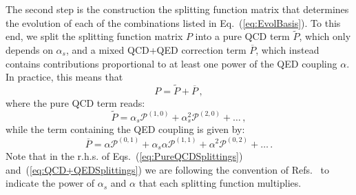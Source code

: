 The second step is the construction the splitting function matrix that
determines the evolution of each of the combinations listed in
Eq.~(\ref{eq:EvolBasis}).
%
To this end, we split the splitting function matrix $P$ into a pure
QCD term $\widetilde{P}$, which only depends on $\alpha_s$, and a
mixed QCD+QED correction term $\overline{P}$, which instead contains
contributions proportional to at least one power of the QED coupling
$\alpha$.
%
In practice, this means that
\begin{equation}
P = \widetilde{P} + \overline{P}\,,
\end{equation}
where the pure QCD term reads:
\begin{equation}\label{eq:PureQCDSplittings}
\widetilde{P} = \alpha_s \mathcal{P}^{(1,0)} + \alpha_s^2 \mathcal{P}^{(2,0)}+\dots\, ,
\end{equation}
while the term containing the QED coupling is given by:
\begin{equation}\label{eq:QCD+QEDSplittings}
\overline{P} = \alpha \mathcal{P}^{(0,1)} + \alpha_s\alpha \mathcal{P}^{(1,1)}+\alpha^2 \mathcal{P}^{(0,2)} + \dots \, .
\end{equation}
Note that in the r.h.s. of Eqs.~(\ref{eq:PureQCDSplittings})
and~(\ref{eq:QCD+QEDSplittings}) we are following the convention of
Refs.~\cite{deFlorian:2015ujt,deFlorian:2016gvk} to indicate the power
of $\alpha_s$ and $\alpha$ that each splitting function multiplies.

